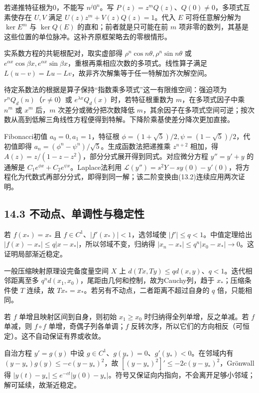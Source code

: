 \documentclass[11pt,a4paper]{article}
\begin{document}
若递推特征根为0，不能写 \(n^j0^n\)。写
\(P(z)=z^mQ(z)\)、\(Q(0)\ne0\)，多项式互素使存在 \(U,V\) 满足
\(U(z)z^m+V(z)Q(z)=1\)。代入 \(E\) 可将任意解分解为 \(\ker E^m\) 与
\(\ker Q(E)\) 的直和；前者就是只可能在前 \(m\)
项非零的数列，其基是这些位置的单位脉冲。这补齐原框架略去的零根情形。

实系数方程的共轭根配对，取实虚部得
\(\rho^n\cos n\theta,\rho^n\sin n\theta\) 或
\(e^{\alpha x}\cos\beta x,e^{\alpha x}\sin\beta x\)，重根再乘相应次数的多项式。线性算子满足
\(L(u-v)=Lu-Lv\)，故非齐次解集等于任一特解加齐次解空间。

待定系数法的根据是算子保持``指数乘多项式''这一有限维空间：强迫项为
\(r^nQ_d(n)\)（\(r\ne0\)）或 \(e^{\lambda x}Q_d(x)\) 时，若特征根重数为
\(m\)，在多项式因子中乘 \(n^m\) 或 \(x^m\) 后，\(m\)
次差分或微分把次数降低
\(m\)，其余因子在多项式空间可逆；按次数从高到低解三角线性方程便得到特解。下降阶乘基使差分降次更加直接。

Fibonacci初值 \(a_0=0,a_1=1\)，特征根
\(\phi=(1+\sqrt5)/2,\psi=(1-\sqrt5)/2\)，代初值即得
\(a_n=(\phi^n-\psi^n)/\sqrt5\)。生成函数法把递推乘 \(z^{n+2}\) 相加，得
\(A(z)=z/(1-z-z^2)\)，部分分式展开得到同式。对应微分方程 \(y''=y'+y\)
的通解是 \(C_1e^{\phi x}+C_2e^{\psi x}\)。Laplace法利用
\(\mathcal L(y'')=s^2Y-sy(0)-y'(0)\)，将方程化为代数式再部分分式，即得到同一解；该二阶变换由(13.2)连续应用两次证明。

\subsection{14.3
不动点、单调性与稳定性}\label{ux4e0dux52a8ux70b9ux5355ux8c03ux6027ux4e0eux7a33ux5b9aux6027}

若 \(f(x_*)=x_*\) 且 \(f\in C^1\)、\(|f'(x_*)|<1\)，选邻域使
\(|f'|\le q<1\)。中值定理给出
\(|f(x)-x_*|\le q|x-x_*|\)，所以邻域不变，归纳得
\(|x_n-x_*|\le q^n|x_0-x_*|\to0\)。这证明局部渐近稳定。

一般压缩映射原理设完备度量空间 \(X\) 上
\(d(Tx,Ty)\le qd(x,y)\)、\(q<1\)。迭代相邻距离至多
\(q^nd(x_1,x_0)\)，尾距由几何和控制，故为Cauchy列，趋于
\(x_*\)；压缩条件使 \(T\) 连续，故
\(Tx_*=x_*\)。若另有不动点，二者距离不超过自身的 \(q\) 倍，只能相同。

若 \(f\) 单增且映射区间到自身，则初始 \(x_1\ge x_0\)
时归纳得全列单增，反之单减。若 \(f\) 单减，则 \(f\circ f\)
单增，奇偶子列各单调；\(f\)
反转次序，所以它们的方向相反（可恒定）。这不自动保证有界或收敛。

自治方程 \(y'=g(y)\) 中设
\(g\in C^1\)、\(g(y_*)=0\)、\(g'(y_*)<0\)。在邻域内有
\((y-y_*)g(y)\le-c(y-y_*)^2\)，故
\([(y-y_*)^2]'\le-2c(y-y_*)^2\)，Grönwall得
\(|y(t)-y_*|\le e^{-ct}|y(0)-y_*|\)。符号又保证向内指向，不会离开足够小邻域；解可延续，故渐近稳定。
\end{document}
